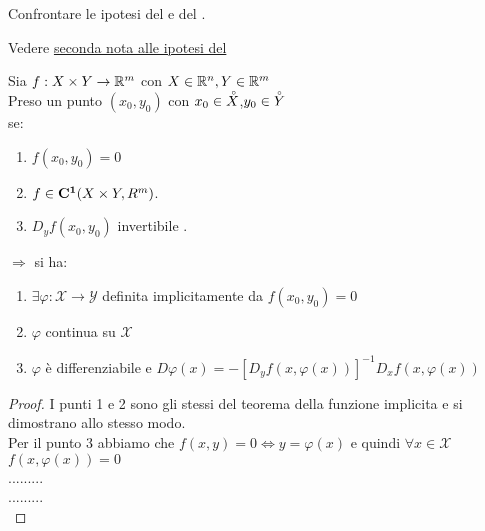 \begin{exercise}
	Confrontare le ipotesi del  e del .
	\begin{solution}
		Vedere \hyperlink{note:teo_funz_impl_note_ipot}{seconda nota alle ipotesi del }
	\end{solution}
\end{exercise}
\proposition
Sia $f:X\times Y\rightarrow \mathbb{R}^m$ con $X\in \mathbb{R}^n, Y\in \mathbb{R}^m$\\
Preso un punto $(x_0,y_0)$ con $x_0\in \accentset{\circ}{X}$,$y_0\in \accentset{\circ}{Y}$\\
se:
\begin{enumerate}
	\item $f(x_0,y_0)=0$
	\item $f\in \mathbf{C^{1}}(X\times Y,R^m)$.
	\item $D_yf(x_0,y_0)$ invertibile .
\end{enumerate}
$\Rightarrow $ si ha:\\
\begin{enumerate}
	\item $\exists \varphi: \mathcal{X}\rightarrow\mathcal{Y}$ definita implicitamente da $f(x_0,y_0)=0$
	\item $\varphi$ continua su $\mathcal{X}$
	\item $\varphi$ è differenziabile e $D\varphi(x)=-[D_yf(x,\varphi(x))]^{-1}D_xf(x,\varphi(x))$
\end{enumerate}
\begin{proof}
	I punti 1 e 2 sono gli stessi del teorema della funzione implicita e si dimostrano allo stesso modo.\\
	Per il punto 3 abbiamo che $f(x,y)=0\iff y=\varphi(x)$ e quindi $\forall x\in \mathcal{X}$ $f(x,\varphi(x))=0$\\
	.........\\
	.........\\
	
\end{proof}

